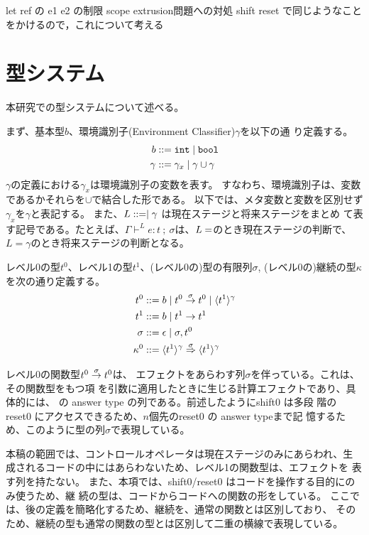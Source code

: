 let ref の e1 e2 の制限 scope extrusion問題への対処
shift reset で同じようなことをかけるので，これについて考える


\section{型システム}

本研究での型システムについて述べる。

まず、基本型$b$、環境識別子(Environment Classifier)$\gamma$を以下の通
り定義する。
\begin{align*}
  b & ::= \mbox{\texttt{int}} \mid \mbox{\texttt{bool}} \\
  \gamma & ::= \gamma_x \mid \gamma \cup \gamma 
\end{align*}
$\gamma$の定義における$\gamma_x$は環境識別子の変数を表す。
すなわち、環境識別子は、変数であるかそれらを$\cup$で結合した形である。
以下では、メタ変数と変数を区別せず$\gamma_x$を$\gamma$と表記する。
また、$L ::= \empty \mid \gamma$ は現在ステージと将来ステージをまとめ
て表す記号である。たとえば、$\Gamma \vdash^L
e:t~;~\sigma$は、$L=\empty$のとき現在ステージの判断で、
$L=\gamma$のとき将来ステージの判断となる。

レベル0の型$t^0$、レベル1の型$t^1$、(レベル0の)型の有限列$\sigma$,
(レベル0の)継続の型$\kappa$を次の通り定義する。
\begin{align*}
  t^0 & ::= b \mid {t^0} \stackrel{\sigma}{\rightarrow} {t^0} \mid \langle{t^1}\rangle^{\gamma} \\
  t^1 & ::= b \mid t^1 \to t^1 \\
  \sigma & ::= \epsilon \mid \sigma,t^0 \\
  \kappa^0 & ::= {\langle{t^1}\rangle^{\gamma}} \stackrel{\sigma}{\Rightarrow} {\langle{t^1}\rangle^{\gamma}}
\end{align*}

レベル0の関数型${t^0} \stackrel{\sigma}{\rightarrow} {t^0}$は、
エフェクトをあらわす列$\sigma$を伴っている。これは、その関数型をもつ項
を引数に適用したときに生じる計算エフェクトであり、具体的には、
\Shiftz の answer type の列である。前述したようにshift0 は多段
階の reset0 にアクセスできるため、$n$個先のreset0 の answer typeまで記
憶するため、このように型の列$\sigma$で表現している。

本稿の範囲では、コントロールオペレータは現在ステージのみにあらわれ、生
成されるコードの中にはあらわないため、レベル1の関数型は、エフェクトを
表す列を持たない。
また、本項では、shift0/reset0 はコードを操作する目的にのみ使うため、継
続の型は、コードからコードへの関数の形をしている。
ここでは、後の定義を簡略化するため、継続を、通常の関数とは区別しており、
そのため、継続の型も通常の関数の型とは区別して二重の横線で表現している。

